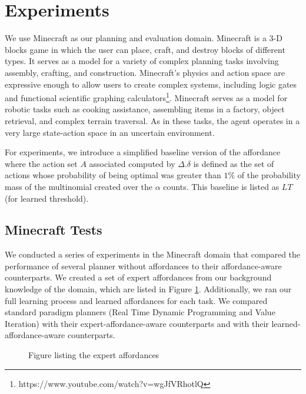 \documentclass[conference]{IEEEtran}
\begin{document}
\section{Experiments}
\label{sec:experiments}

We use Minecraft as our planning and evaluation domain. Minecraft is a
3-D blocks game in which the user can place, craft, and destroy blocks
of different types. It serves as a model for a variety of complex planning tasks involving 
assembly, crafting, and construction.  Minecraft's physics and action space are expressive
enough to allow users to create complex systems, including logic gates and 
functional scientific graphing calculators\footnote{https://www.youtube.com/watch?v=wgJfVRhotlQ}.
Minecraft serves as a model for robotic tasks such as cooking assistance, assembling
items in a factory, object retrieval, and complex terrain traversal.  As in these tasks, 
the agent operates in a very large state-action space in an uncertain environment.

For experiments, we introduce a simplified baseline version of the affordance where
the action set $A$ associated computed by $\Delta.\delta$ is defined
as the set of actions whose probability of being optimal was greater than $1\%$
of the probability mass of the multinomial created over the $\alpha$ counts. This
baseline is listed as $LT$ (for learned threshold).

\subsection{Minecraft Tests}
We conducted a series of experiments in the Minecraft domain that
compared the performance of several planner without affordances
to their affordance-aware counterparts. We created a set of expert
affordances from our background knowledge of the domain, which are
listed in Figure \ref{fig:afford_kb_exp}. Additionally, we ran our full
learning process and learned affordances for each task. We compared
standard paradigm planners (Real Time Dynamic Programming and 
Value Iteration) with their expert-affordance-aware counterparts and with
their learned-affordance-aware counterparts.

\begin{figure}
Figure listing the expert affordances
\label{fig:afford_kb_exp}
\end{figure}
\end{document}
